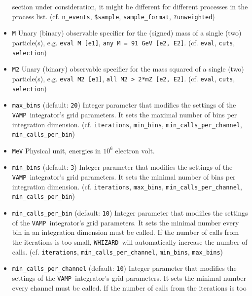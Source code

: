 \documentclass[12pt]{book}
\newcommand{\ttt}[1]{\texttt{#1}}
\newcommand{\whizard}{\texttt{WHIZARD}}
\newcommand{\vamp}{\texttt{VAMP}}
\begin{document}
\begin{itemize}
section under consideration, it might be different for different
processes in the process list. 
(cf. \ttt{n\_events}, \ttt{\$sample}, \ttt{sample\_format},
\ttt{?unweighted}) 
\item
\ttt{M} \newline
Unary (binary) observable specifier for the (signed) mass of a single
(two) particle(s), e.g. \ttt{eval M [e1]}, \ttt{any M = 91 GeV [e2,
  E2]}. (cf. \ttt{eval}, \ttt{cuts}, \ttt{selection})
\item
\ttt{M2} \newline
Unary (binary) observable specifier for the mass squared of a single
(two) particle(s), e.g. \ttt{eval M2 [e1]}, \ttt{all M2 > 2*mZ [e2,
  E2]}. (cf. \ttt{eval}, \ttt{cuts}, \ttt{selection})
\item
\ttt{max\_bins} \qquad (default: \ttt{20}) \newline
Integer parameter that modifies the settings of the \vamp\
integrator's grid parameters. It sets the maximal number of bins per
integration dimension. (cf. \ttt{iterations}, \ttt{min\_bins},
\ttt{min\_calls\_per\_channel}, \ttt{min\_calls\_per\_bin})  
\item
\ttt{MeV} \newline
Physical unit, energies in $10^6$ electron volt.
\item
\ttt{min\_bins} \qquad (default: \ttt{3}) \newline
Integer parameter that modifies the settings of the \vamp\
integrator's grid parameters. It sets the minimal number of bins per
integration dimension. (cf. \ttt{iterations}, \ttt{max\_bins},
\ttt{min\_calls\_per\_channel}, \ttt{min\_calls\_per\_bin})  
\item
\ttt{min\_calls\_per\_bin} \qquad (default: \ttt{10}) \newline
Integer parameter that modifies the settings of the \vamp\
integrator's grid parameters. It sets the minimal number every bin in
an integration dimension must be called. If the number of calls
from the iterations is too small, \whizard\ will automatically
increase the number of calls. (cf. \ttt{iterations},
\ttt{min\_calls\_per\_channel}, \ttt{min\_bins}, \ttt{max\_bins})
\item
\ttt{min\_calls\_per\_channel} \qquad (default: \ttt{10}) \newline
Integer parameter that modifies the settings of the \vamp\
integrator's grid parameters. It sets the minimal number every channel
must be called. If the number of calls from the iterations is too

\end{itemize}
\end{document}
